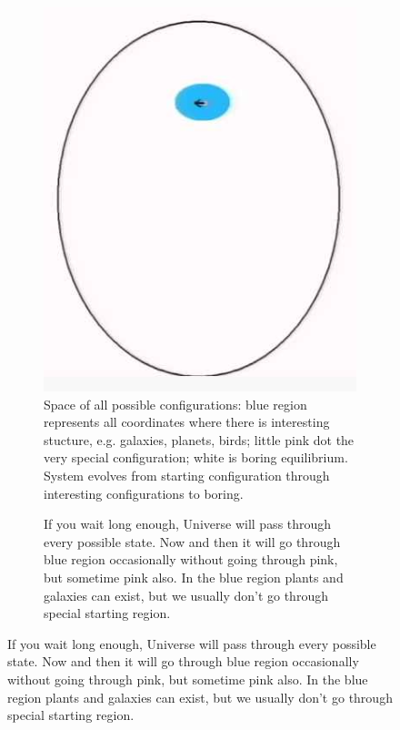 \documentclass[]{article}
\begin{document}
\begin{figure}[H]
	\caption{Configuration Space}
	\begin{subfigure}[b]{0.3\textwidth}
		\caption{Space of all possible configurations: blue region represents all coordinates where there is interesting stucture, e.g. galaxies, planets, birds; little pink dot the very special configuration; white is boring equilibrium. System evolves from starting configuration through interesting configurations to boring.}
		\includegraphics[width=\textwidth]{time-config-space}
	\end{subfigure}
	\;
	\begin{subfigure}[b]{0.3\textwidth}
		\caption{If you wait long enough, Universe will pass through every possible state.  Now and then it will go through blue region occasionally without going through pink, but sometime pink also. In the blue region plants and galaxies can exist, but we usually don't go through special starting region.}\label{fig:time-univers-passes-through-every-possible-state}

\end{subfigure}
\end{figure}
\end{document}
